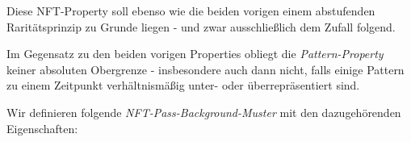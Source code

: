 
\begin{sloppypar}
Diese NFT-Property soll ebenso wie die beiden vorigen einem abstufenden Raritätsprinzip zu Grunde liegen - und zwar ausschließlich dem Zufall folgend.
\end{sloppypar}

Im Gegensatz zu den beiden vorigen Properties obliegt die \textit{Pattern-Property} keiner absoluten Obergrenze - insbesondere auch dann nicht, falls einige Pattern zu einem Zeitpunkt verhältnismäßig unter- oder überrepräsentiert sind.

\vspace{0.3cm}

\begin{NFT-Prop}

Wir definieren folgende \textit{NFT-Pass-Background-Muster} mit den dazugehörenden Eigenschaften:


\end{NFT-Prop}
